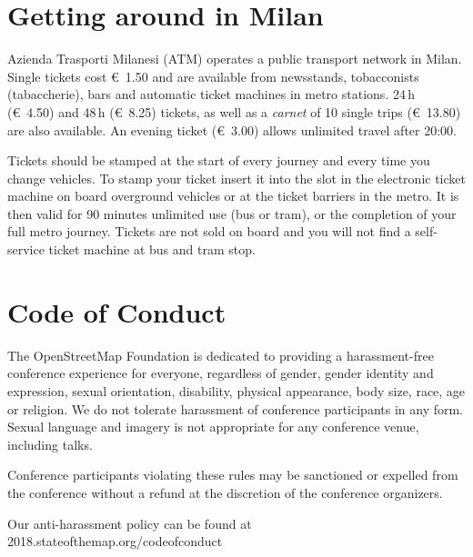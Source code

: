 \section*{Getting around in Milan}
\label{getting-around}
\pagestyle{cropmarksstyle}
Azienda Trasporti Milanesi (ATM) operates a public transport network in Milan. Single tickets cost
€~1.50 and are available from newsstands, tobacconists (tabaccherie), bars and automatic ticket
machines in metro stations. 24\,h (€~4.50) and 48\,h (€~8.25) tickets, as well as a \emph{carnet} of 10 single
trips (€~13.80) are also available. An evening ticket (€~3.00) allows unlimited travel after 20:00.

Tickets should be stamped at the start of every journey and every time you change vehicles. To stamp
your ticket insert it into the slot in the electronic ticket machine on board overground vehicles or
at the ticket barriers in the metro. It is then valid for 90 minutes unlimited use (bus or tram), or
the completion of your full metro journey. Tickets are not sold on board and you will not find a
self-service ticket machine at bus and tram stop.

\section*{Code of Conduct}
\label{coc}
The OpenStreetMap Foundation is dedicated to providing a harassment-free conference experience for everyone, regardless of gender, gender identity and expression, sexual orientation, disability, physical appearance, body size, race, age or religion. We do not tolerate harassment of conference participants in any form. Sexual language and imagery is not appropriate for any conference venue, including talks.

Conference participants violating these rules may be sanctioned or expelled from the conference without a refund at the discretion of the conference organizers.

Our anti-harassment policy can be found at 2018.stateofthemap.org/codeofconduct

